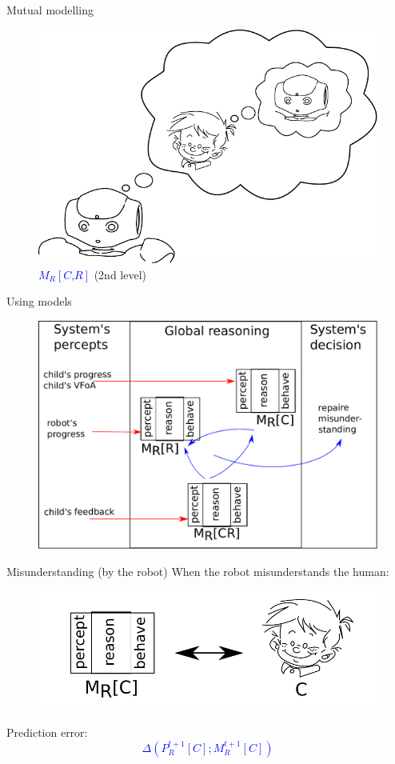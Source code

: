 \documentclass[compress]{beamer}
\begin{document}
\begin{frame}{Mutual modelling}
\begin{figure}[!tbp]
	\hfill
	\begin{minipage}[b]{.4\textwidth}
		\includegraphics[width=0.8\columnwidth]{naoMM2}
		\caption{\textcolor{blue}{$M_R\left[\textit{C,R}\right]$} (2nd level)}
	\end{minipage}
	
\end{figure}
\end{frame}

\begin{frame}{Using models}
\centering
\begin{figure}
\includegraphics[width=0.8\columnwidth]{archi_general}
\end{figure}
\end{frame}

\begin{frame}{Misunderstanding (by the robot)}
When the robot misunderstands the human:
\centering
\begin{figure}
\includegraphics[width=0.8\columnwidth]{true_mis11}
\end{figure}

Prediction error:
\huge
\textcolor{blue}{$$\Delta \left(P^{t+1}_R\left[\textit{C}\right] ; M^{t+1}_R\left[\textit{C}\right]\right)$$}
\end{frame}
\end{document}
